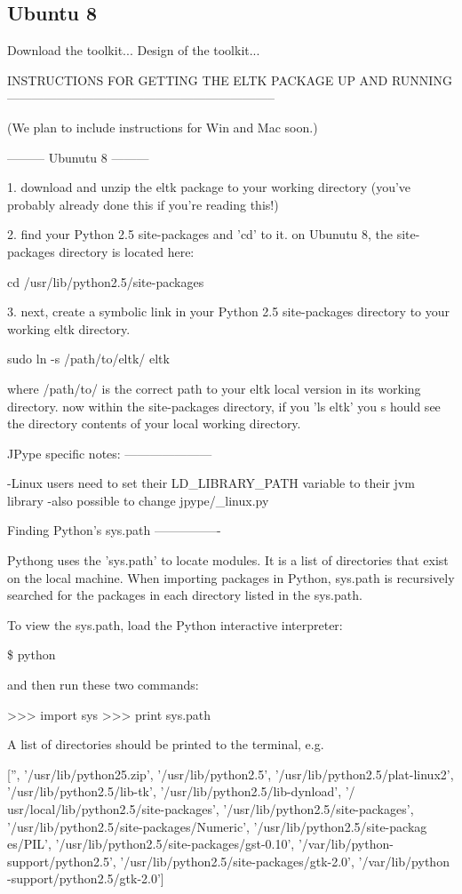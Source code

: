 \documentclass[]{article}
\begin{document}
\subsection{Ubuntu 8}

Download the toolkit... Design of the toolkit...

INSTRUCTIONS FOR GETTING THE ELTK PACKAGE UP AND RUNNING
-----------------------------------------------------------------

(We plan to include instructions for Win and Mac soon.)

---------
Ubunutu 8
---------

1. download and unzip the eltk package to your working directory (you've probably already done this if you're reading this!)

2. find your Python 2.5 site-packages and 'cd' to it. on Ubunutu 8, the site-packages directory is located here:

cd /usr/lib/python2.5/site-packages

3. next, create a symbolic link in your Python 2.5 site-packages directory to your working eltk directory. 

sudo ln -s /path/to/eltk/  eltk

where /path/to/ is the correct path to your eltk local version in its working directory. now within the site-packages directory, if you 'ls eltk' you s
hould see the directory contents of your local working directory.


JPype specific notes:
---------------------

-Linux users need to set their LD\_LIBRARY\_PATH variable  to their jvm library
-also possible to change  jpype/\_linux.py


Finding Python's sys.path
----------------

Pythong uses the 'sys.path' to locate modules. It is a list of directories that exist on the local machine. When importing packages in Python, sys.path
 is recursively searched for the packages in each directory listed in the sys.path. 

To view the sys.path, load the Python interactive interpreter:

\$ python

and then run these two commands:

>>> import sys
>>> print sys.path

A list of directories should be printed to the terminal, e.g.

['', '/usr/lib/python25.zip', '/usr/lib/python2.5', '/usr/lib/python2.5/plat-linux2', '/usr/lib/python2.5/lib-tk', '/usr/lib/python2.5/lib-dynload', '/
usr/local/lib/python2.5/site-packages', '/usr/lib/python2.5/site-packages', '/usr/lib/python2.5/site-packages/Numeric', '/usr/lib/python2.5/site-packag
es/PIL', '/usr/lib/python2.5/site-packages/gst-0.10', '/var/lib/python-support/python2.5', '/usr/lib/python2.5/site-packages/gtk-2.0', '/var/lib/python
-support/python2.5/gtk-2.0']
 
\end{document}
